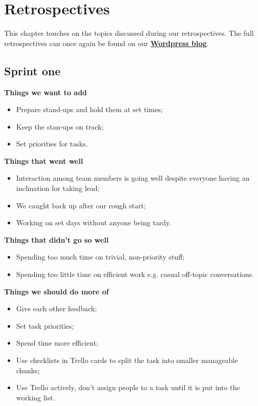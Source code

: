 \documentclass[12pt]{article}
\begin{document}
	\section{Retrospectives}
	This chapter touches on the topics discussed during our retrospectives. The full retrospectives can once again be found on our \href{https://metabotsrow.wordpress.com/}{\textbf{Wordpress blog}}.
	\subsection{Sprint one}
	\textbf{Things we want to add}
	\begin{itemize}
		\item  Prepare stand-ups and hold them at set times;
	 	\item Keep the stan-ups on track;
	 	\item Set priorities for tasks.
	\end{itemize}
	\textbf{Things that went well}
	\begin{itemize}
		\item Interaction among team members is going well despite everyone having an inclination for taking lead;
		\item We caught back up after our rough start;
		\item Working on set days without anyone being tardy.
	\end{itemize}
	\textbf{Things that didn't go so well}
	\begin{itemize}
		\item Spending too much time on trivial, non-priority stuff;
		\item Spending too little time on efficient work e.g. casual off-topic conversations.
	\end{itemize}
	\textbf{Things we should do more of}
	\begin{itemize}
		\item Give each other feedback;
		\item Set task priorities;
		\item Spend time more efficient;
		\item Use checklists in Trello cards to split the task into smaller manageable chunks;
		\item Use Trello actively, don't assign people to a task until it is put into the working list.
	\end{itemize}
\end{document}
